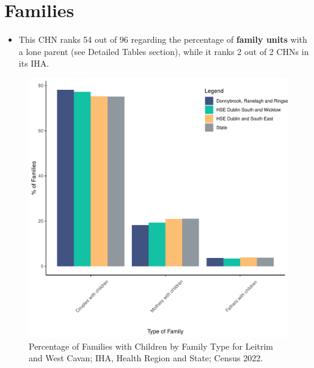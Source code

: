 \documentclass{article}
\begin{document}
\section{Families}\label{sect:Fam}
\begin{itemize}
\item This CHN ranks  54 out of 96 regarding the percentage of \textbf{family units} with a lone parent (see Detailed Tables section), while it ranks   2 out of 2 CHNs in its IHA.
\end{itemize}
\begin{figure}[H]
	\centering
	\includegraphics[width = 150mm]{../figures/FamED.pdf}
	\caption{Percentage of Families with Children by Family Type for Leitrim and West Cavan; IHA, Health Region and State; Census 2022.}
	\label{fig:vbnv}
	\end{figure}
	
\end{document}
